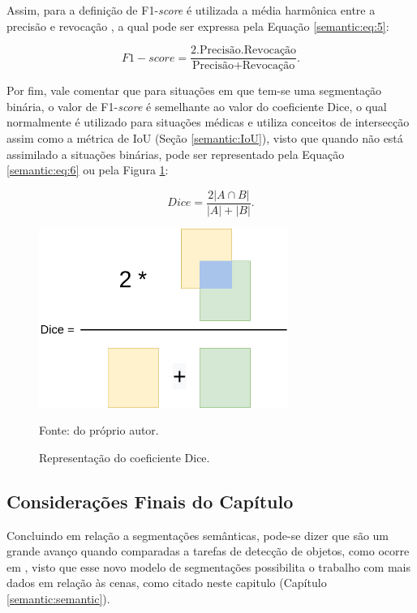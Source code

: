 Assim, para a definição de F1-\textit{score} é utilizada a média harmônica entre a precisão e revocação \cite{Minaee2021}, a qual pode ser expressa pela Equação \ref{semantic:eq:5}:

\begin{equation}
    \label{semantic:eq:5}
    F1-score = \frac{2 . \text{Precisão} . \text{Revocação}}{\text{Precisão} + \text{Revocação}}.
\end{equation}

Por fim, vale comentar que para situações em que tem-se uma segmentação binária, o valor de F1-\textit{score} é semelhante ao valor do coeficiente Dice, o qual normalmente é utilizado para situações médicas \cite{Minaee2021} e utiliza conceitos de intersecção assim como a métrica de IoU (Seção \ref{semantic:IoU}), visto que quando não está assimilado a situações binárias, pode ser representado pela Equação \ref{semantic:eq:6} ou pela Figura \ref{semantic:fig:2}:

\begin{equation}
    \label{semantic:eq:6}
    Dice = \frac{2|A \cap B|}{|A| + |B|}.
\end{equation}

\begin{figure}[H]
    \centering
    \caption{Representação do coeficiente Dice.}
    \includegraphics[height=2.3in]{recursos/imagens/semantic/dice.png}
    \label{semantic:fig:2}

    Fonte: do próprio autor.
\end{figure}

\subsection{Considerações Finais do Capítulo}
\label{semantic:conclusion}
Concluindo em relação a segmentações semânticas, pode-se dizer que são um grande avanço quando comparadas a tarefas de detecção de objetos, como ocorre em \cite{Vaillant1994}, visto que esse novo modelo de segmentações possibilita o trabalho com mais dados em relação às cenas, como citado neste capitulo (Capítulo \ref{semantic:semantic}).

